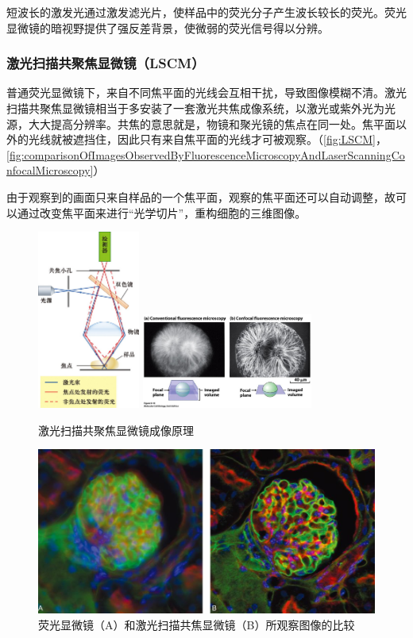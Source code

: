 短波长的激发光通过激发滤光片，使样品中的荧光分子产生波长较长的荧光。荧光显微镜的暗视野提供了强反差背景，使微弱的荧光信号得以分辨。

\subsubsection{激光扫描共聚焦显微镜（LSCM）}

普通荧光显微镜下，来自不同焦平面的光线会互相干扰，导致图像模糊不清。激光扫描共聚焦显微镜相当于多安装了一套激光共焦成像系统，以激光或紫外光为光源，大大提高分辨率。共焦的意思就是，物镜和聚光镜的焦点在同一处。焦平面以外的光线就被遮挡住，因此只有来自焦平面的光线才可被观察。（\autoref{fig:LSCM}，\autoref{fig:comparisonOfImagesObservedByFluorescenceMicroscopyAndLaserScanningConfocalMicroscopy}）

由于观察到的画面只来自样品的一个焦平面，观察的焦平面还可以自动调整，故可以通过改变焦平面来进行“光学切片”，重构细胞的三维图像。

\begin{figure}[htbp]
	\centering
	\includegraphics[width=0.3\textwidth]{Pics/激光扫描共聚焦显微镜}
	\includegraphics[width=0.5\textwidth]{Pics/激光扫描共聚焦显微镜2}
	\caption{激光扫描共聚焦显微镜成像原理}
	\label{fig:LSCM}
\end{figure}


\begin{figure}[htbp]
	\centering
	\includegraphics[width=0.7\linewidth]{Pics/荧光显微镜和激光扫描共焦显微镜所观察图像的比较}
	\caption{荧光显微镜（A）和激光扫描共焦显微镜（B）所观察图像的比较}
	\label{fig:comparisonOfImagesObservedByFluorescenceMicroscopyAndLaserScanningConfocalMicroscopy}
\end{figure}


